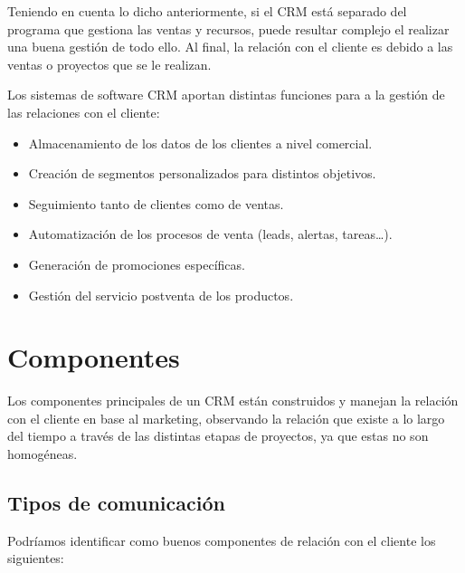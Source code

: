 Teniendo en cuenta lo dicho anteriormente, si el CRM está separado del programa que gestiona las ventas y recursos, puede resultar complejo el realizar una buena gestión de todo ello. Al final, la relación con el cliente es debido a las ventas o proyectos que se le realizan.

Los sistemas de software CRM aportan distintas funciones para a la gestión de las relaciones con el cliente:

\begin{itemize}
    \item Almacenamiento de los datos de los clientes a nivel comercial.
    \item Creación de segmentos personalizados para distintos objetivos.
    \item Seguimiento tanto de clientes como de ventas.
    \item Automatización de los procesos de venta (leads, alertas, tareas…).
    \item Generación de promociones específicas.
    \item Gestión del servicio postventa de los productos.
\end{itemize}


\chapter{Componentes}
Los componentes principales de un CRM están construidos y manejan la relación con el cliente en base al marketing, observando la relación que existe a lo largo del tiempo a través de las distintas etapas de proyectos, ya que estas no son homogéneas.



\section{Tipos de comunicación}
Podríamos identificar como buenos componentes de relación con el cliente los siguientes:

